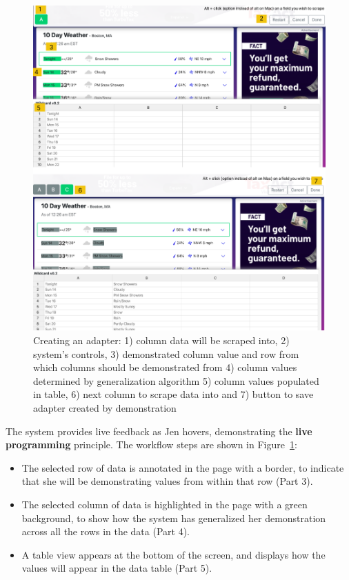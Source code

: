 \documentclass[sigconf,10pt]{acmart}
\providecommand{\tightlist}{%
  \setlength{\itemsep}{0pt}\setlength{\parskip}{0pt}}
\begin{document}
\begin{figure}
  \includegraphics[width=\textwidth]{media/creating.png}
  \caption{\label{fig:creating} Creating an adapter: 1) column data will be scraped into, 2) system's controls, 3) demonstrated column value and row from which columns should be demonstrated from 4) column values determined by generalization algorithm 5) column values populated in table, 6) next column to scrape data into and 7) button to save adapter created by demonstration}
\end{figure}

The system provides live feedback as Jen hovers, demonstrating the
\textbf{live programming} principle. The workflow steps are shown in
Figure~\ref{fig:creating}:

\begin{itemize}
\tightlist
\item
  The selected row of data is annotated in the page with a border, to
  indicate that she will be demonstrating values from within that row
  (Part 3).
\item
  The selected column of data is highlighted in the page with a green
  background, to show how the system has generalized her demonstration
  across all the rows in the data (Part 4).
\item
  A table view appears at the bottom of the screen, and displays how the
  values will appear in the data table (Part 5).
\end{itemize}
\end{document}
